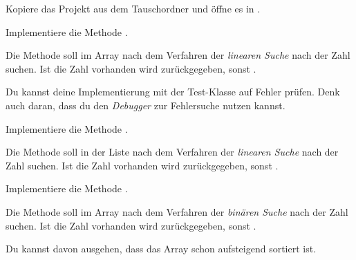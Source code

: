 \documentclass[11pt, a4paper, ngerman]{arbeitsblatt}
\begin{document}
\ReiheTitel

\begin{aufgabe}[subtitle=Lineare Suche I,icon=\iconComputer]
	\label{aufg:lin-array}
	Kopiere das Projekt  aus dem Tauschordner und öffne es in
	.

	Implementiere die Methode .

	Die Methode soll im Array  nach dem Verfahren der
	\emph{linearen Suche} nach der Zahl  suchen. Ist die Zahl
	vorhanden wird  zurückgegeben, sonst
	.

	Du kannst deine Implementierung mit der Test-Klasse auf Fehler prüfen. Denk
	auch daran, dass du den \emph{Debugger} zur Fehlersuche nutzen kannst.
\end{aufgabe}

\begin{aufgabe}[subtitle=Lineare Suche II,icon=\iconComputer]
	\label{aufg:lin-list}
	Implementiere die Methode .

	Die Methode soll in der Liste  nach dem Verfahren der
	\emph{linearen Suche} nach der Zahl  suchen. Ist die
	Zahl vorhanden wird  zurückgegeben, sonst
	.
\end{aufgabe}

\begin{aufgabe}[subtitle=Binäre Suche,icon=\iconComputer]
	\label{aufg:bin-array}
	Implementiere die Methode .

	Die Methode soll im Array  nach dem Verfahren der
	\emph{binären Suche} nach der Zahl  suchen. Ist die
	Zahl vorhanden wird  zurückgegeben, sonst
	.

	Du kannst davon ausgehen, dass das Array  schon
	aufsteigend sortiert ist.


\end{aufgabe}
\end{document}
